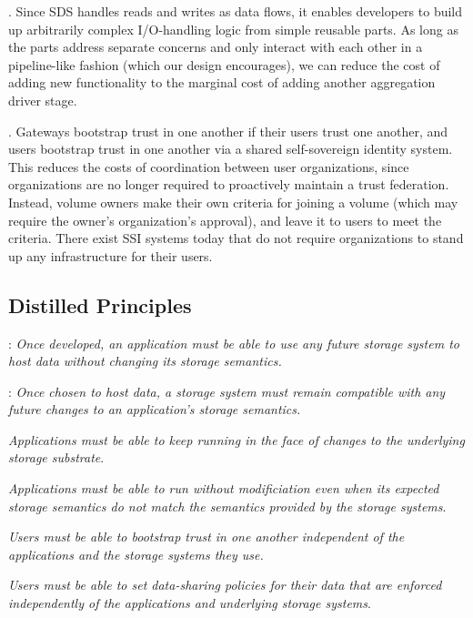 .  Since SDS handles reads
and writes as data flows, it enables developers to build up arbitrarily complex
I/O-handling logic from simple reusable parts.  As long as the parts address
separate concerns and only interact with each other in a pipeline-like fashion
(which our design encourages), we can reduce the cost of adding new
functionality to the marginal cost of adding another aggregation driver stage.

.  Gateways bootstrap
trust in one another if their users trust one another, and users bootstrap trust
in one another via a shared self-sovereign identity system.  This reduces the costs of
coordination between user organizations, since organizations are no longer
required to proactively maintain a trust federation.  Instead, volume owners
make their own criteria for joining a volume (which may require the owner's
organization's approval), and leave it to users to meet the criteria.
There exist SSI systems today that do not require organizations to stand up any
infrastructure for their users.

\subsection{Distilled Principles}

: \emph{Once developed, an application must be able to use any future storage
system to host data without changing its storage semantics.}

: \emph{Once chosen to host data, a storage system must remain compatible with any
future changes to an application's storage semantics.}

\emph{Applications must be able to keep running in the face of changes
to the underlying storage substrate}.

\emph{Applications must be able to run without modificiation even when its
expected storage semantics do not match the semantics provided by the storage systems}.


\emph{Users must be able to bootstrap trust in one another independent of the
applications and the storage systems they use.}

\emph{Users must be able to set data-sharing policies
for their data that are enforced independently of the applications and underlying storage
systems}.
